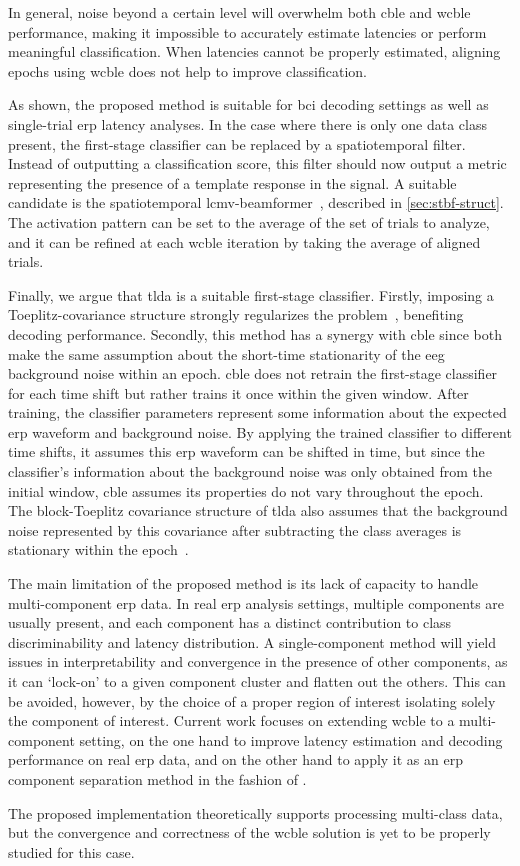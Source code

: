 In general, noise beyond a certain level will overwhelm both \ac{cble} and
\ac{wcble} performance, making it impossible to accurately estimate latencies
or perform meaningful classification.
When latencies cannot be properly estimated, aligning epochs using \ac{wcble} does not help to improve classification.

As shown, the proposed method is suitable for \ac{bci} decoding settings
as well as single-trial \ac{erp} latency analyses.
In the case where there is only one data class present, the first-stage
classifier can be replaced by a spatiotemporal filter.
Instead of outputting a classification score, this filter should now output a
metric representing the presence of a template response in the signal.
A suitable candidate is the spatiotemporal
\ac{lcmv}-beamformer~\cite{VanVliet2015}, described in
\cref{sec:stbf-struct}.
The activation pattern can be set to the average of the set of trials to
analyze, and it can be refined at each \ac{wcble} iteration by taking the
average of aligned trials.

Finally, we argue that \ac{tlda} is a suitable first-stage classifier.
Firstly, imposing a Toeplitz-covariance structure strongly regularizes the
problem~\cite{Sosulski2022, VanDenKerchove2022}, benefiting decoding performance.
Secondly, this method has a synergy with \ac{cble} since both make the same
assumption about the short-time stationarity of the \ac{eeg} background noise
within an epoch.
\Ac{cble} does not retrain the first-stage classifier for each time shift but
rather trains it once within the given window.
After training, the classifier parameters represent some information about the
expected \ac{erp} waveform and background noise.
By applying the trained classifier to different time shifts, it assumes this
\ac{erp} waveform can be shifted in time, but since the classifier's information about
the background noise was only obtained from the initial window, \ac{cble} assumes
its properties do not vary throughout the epoch.
The block-Toeplitz covariance structure of \ac{tlda} also assumes that the
background noise represented by this covariance after subtracting the class
averages is stationary within the epoch~\cite{Sosulski2022}.

The main limitation of the proposed method is its lack of capacity to handle
multi-component \ac{erp} data.
In real \ac{erp} analysis settings, multiple components are usually present,
and each component has a distinct contribution to class discriminability and
latency distribution.
A single-component method will yield issues in interpretability and convergence
in the presence of other components, as it can `lock-on' to a given component
cluster and flatten out the others.
This can be avoided, however, by the choice of a proper region of interest
isolating solely the component of interest.
Current work focuses on extending \ac{wcble} to a multi-component setting, on
the one hand to improve latency estimation and decoding performance on real
\ac{erp} data, and on the other hand to apply it as an \ac{erp} component
separation method in the fashion of \textcite{Ouyang2017}.

The proposed implementation theoretically supports processing multi-class
data, but the convergence and correctness of the \ac{wcble} solution is yet to
be properly studied for this case.

